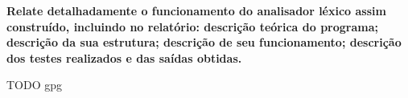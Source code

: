 
\textbf{Relate detalhadamente o funcionamento do analisador léxico assim construído, incluindo no relatório: descrição teórica do programa; descrição da sua estrutura; descrição de seu funcionamento; descrição dos testes realizados e das saídas obtidas.}

TODO gpg
